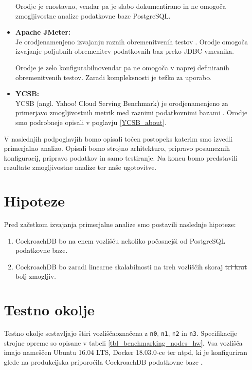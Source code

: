 \documentclass[a4paper, 12pt]{book}
\providecommand{\DIFaddtex}[1]{{\protect\color{blue}\uwave{#1}}} %
\providecommand{\DIFdeltex}[1]{{\protect\color{red}\sout{#1}}}                      %
\providecommand{\DIFaddbegin}{} %
\providecommand{\DIFaddend}{} %
\providecommand{\DIFdelbegin}{} %
\providecommand{\DIFdelend}{} %
\providecommand{\DIFadd}[1]{\texorpdfstring{\DIFaddtex{#1}}{#1}} %
\providecommand{\DIFdel}[1]{\texorpdfstring{\DIFdeltex{#1}}{}} %
\newcommand{\DIFscaledelfig}{0.5}
\newlength{\DIFdelgraphicswidth} %
\newlength{\DIFdelgraphicsheight} %
\newcommand{\DIFaddincludegraphics}[2][]{{\color{blue}\fbox{\DIFOincludegraphics[#1]{#2}}}} %
\newcommand{\DIFdelincludegraphics}[2][]{%
\sbox{\DIFdelgraphicsbox}{\DIFOincludegraphics[#1]{#2}}%
\settoboxwidth{\DIFdelgraphicswidth}{\DIFdelgraphicsbox} %
\settoboxtotalheight{\DIFdelgraphicsheight}{\DIFdelgraphicsbox} %
\scalebox{\DIFscaledelfig}{%
\parbox[b]{\DIFdelgraphicswidth}{\usebox{\DIFdelgraphicsbox}\\[-\baselineskip] \rule{\DIFdelgraphicswidth}{0em}}\llap{\resizebox{\DIFdelgraphicswidth}{\DIFdelgraphicsheight}{%
\setlength{\unitlength}{\DIFdelgraphicswidth}%
\begin{picture}(1,1)%
\thicklines\linethickness{2pt} %
{\color[rgb]{1,0,0}\put(0,0){\framebox(1,1){}}}%
{\color[rgb]{1,0,0}\put(0,0){\line( 1,1){1}}}%
{\color[rgb]{1,0,0}\put(0,1){\line(1,-1){1}}}%
\end{picture}%
}\hspace*{3pt}}} %
} %
\DeclareRobustCommand{\DIFaddbegin}{\DIFOaddbegin \let\includegraphics\DIFaddincludegraphics} %
\DeclareRobustCommand{\DIFaddend}{\DIFOaddend \let\includegraphics\DIFOincludegraphics} %
\DeclareRobustCommand{\DIFdelbegin}{\DIFOdelbegin \let\includegraphics\DIFdelincludegraphics} %
\DeclareRobustCommand{\DIFdelend}{\DIFOaddend \let\includegraphics\DIFOincludegraphics} %
\begin{document}
\begin{itemize}
    Orodje je enostavno, vendar pa je slabo dokumentirano in ne omogoča zmogljivostne analize podatkovne baze PostgreSQL.
    \item \textbf{Apache JMeter:}\\ Je orodje\DIFaddbegin \DIFadd{, }\DIFaddend namenjeno izvajanju raznih obremenitvenih testov \cite{jmeter}. Orod\-je omogoča izvajanje poljubnih obremenitev podatkovnih baz preko JDBC vmesnika.

    Orodje je zelo konfigurabilno\DIFaddbegin \DIFadd{, }\DIFaddend vendar pa ne omogoča v naprej definiranih obremenitvenih testov. Zaradi kompleksnosti je težko za uporabo.
    \item \textbf{YCSB:}\\ YCSB (angl. Yahoo! Cloud Serving Benchmark) je orodje\DIFaddbegin \DIFadd{, }\DIFaddend namenjeno za primerjavo zmogljivostnih metrik med raznimi podatkovnimi bazami \cite{brianfrankcooper/YCSB}. Orodje smo podrobneje opisali v poglavju \ref{YCSB_about}.
\end{itemize}

V naslednjih podpoglavjih bomo opisali točen postopek\DIFaddbegin \DIFadd{, }\DIFaddend s katerim smo izvedli primerjalno analizo. Opisali bomo strojno arhitekturo, pripravo posameznih konfiguracij, pripravo podatkov in samo testiranje. Na koncu bomo predstavili rezultate zmogljivostne analize ter naše ugotovitve.

\section{Hipoteze}
Pred začetkom izvajanja primerjalne analize smo postavili naslednje hipoteze:
\begin{enumerate}
    \item CockroachDB bo na enem vozlišču nekoliko počasnejši od PostgreSQL podatkovne baze.

    \item CockroachDB bo zaradi linearne skalabilnosti na treh vozliščih skoraj \DIFdelbegin \DIFdel{tri krat }\DIFdelend \DIFaddbegin \DIFadd{trikrat }\DIFaddend bolj zmogljiv.
\end{enumerate}

\section{Testno okolje}
Testno okolje sestavljajo štiri vozlišča\DIFaddbegin \DIFadd{, }\DIFaddend označena z \texttt{n0}, \texttt{n1}, \texttt{n2} in \texttt{n3}. Specifikacije strojne opreme so opisane v tabeli \ref{tbl_benchmarking_nodes_hw}. Vsa vozlišča imajo nameščen Ubuntu 16.04 LTS, Docker 18.03.0-ce ter ntpd, ki je konfiguriran glede na produkcijska priporočila  CockroachDB podatkovne baze \cite{CRDB-ntpd-configuration}.
\end{document}
